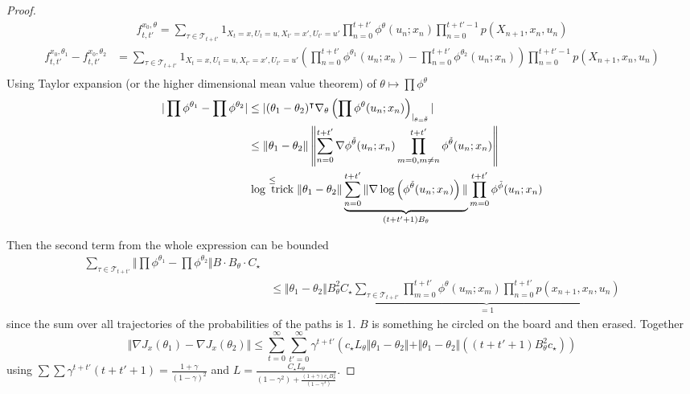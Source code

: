 \begin{proof}
    \begin{align*}
        f_{t,t'}^{x_0,\theta}=\sum_{\tau\in \mathcal{T}_{t+t'}} 1_{X_t=x,U_t=u,X_{t'}=x',U_{t'}=u'}\prod_{n=0}^{t+t'}\phi^\theta(u_n;x_n)\prod_{n=0}^{t+t'-1}p(X_{n+1},x_n,u_n)
    \end{align*}
    \begin{align*}
        f_{t,t'}^{x_0,\theta_1}-f_{t,t'}^{x_0,\theta_2}&=\sum_{\tau\in \mathcal{T}_{t+t'}} 1_{X_t=x,U_t=u,X_{t'}=x',U_{t'}=u'}\left(\prod_{n=0}^{t+t'}\phi^{\theta_1}(u_n;x_n)-\prod_{n=0}^{t+t'}\phi^{\theta_2}(u_n;x_n)\right)\prod_{n=0}^{t+t'-1}p(X_{n+1},x_n,u_n)\\
    \end{align*}
    Using Taylor expansion (or the higher dimensional mean value theorem) of \(\theta\mapsto \prod \phi^\theta\)
    \begin{align*}
        \vert \prod \phi^{\theta_1}-\prod \phi^{\theta_2}\vert&\leq \vert (\theta_1-\theta_2)^\intercal \nabla_\theta\left(\prod \phi^\theta(u_n;x_n)\right)_{|_{\theta=\tilde{\theta}}} \vert \\
        &\leq \Vert \theta_1-\theta_2\Vert \left\Vert \sum_{n=0}^{t+t'}\nabla\phi^{\tilde{\theta}}(u_n;x_n) \prod_{m=0,m\neq n}^{t+t'}\phi^{\tilde{\theta}}(u_n;x_n) \right\Vert\\
        &\stackrel{\leq }{\log \text{ trick}} \Vert \theta_1-\theta_2\Vert \underbrace{\sum_{n=0}^{t+t'}\Vert \nabla\log \left(\phi^{\tilde{\theta}}(u_n;x_n)\right)\Vert}_{(t+t'+1)B_{\theta}} \prod_{m=0}^{t+t'}\phi^{\tilde{\phi}}(u_n;x_n)
    \end{align*}

    Then the second term from the whole expression  can be bounded 
    \begin{align*}
        \sum_{\tau\in \mathcal{T}_{t+t'}}\Vert \prod \phi^{\theta_1}-\prod \phi^{\theta_2}\Vert B \cdot B_\theta \cdot C_\star\\
        &\leq \Vert \theta_1-\theta_2\Vert B_\theta^2 C_\star \underbrace{\sum_{\tau\in \mathcal{T}_{t+t'}}\prod_{m=0}^{t+t'}\phi^\theta(u_m;x_m)\prod_{n=0}^{t+t'}p(x_{n+1},x_n,u_n)}_{=1}
    \end{align*}
    since the sum over all trajectories of the probabilities of the paths is 1. \(B\) is something he circled on the board and then erased.
    Together \[\Vert \nabla J_x(\theta_1)-\nabla J_x(\theta_2)\Vert\leq \sum_{t=0}^{\infty}\sum_{t'=0}^{\infty}\gamma^{t+t'}\left(c_\star L_\theta\Vert \theta_1-\theta_2\Vert + \Vert \theta_1-\theta_2\Vert\left((t+t'+1)B_\theta^2 c_\star\right)\right)\]
    using \(\sum\sum\gamma^{t+t'}(t+t'+1)=\frac{1+\gamma}{(1-\gamma)^2}\)
    and \(L=\frac{C_\star L_\theta}{(1-\gamma^2)+\frac{(1+\gamma)c_\star B_\theta^2}{(1-\gamma^3)}}\).
\end{proof}
